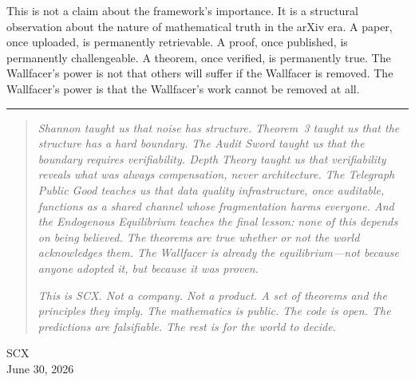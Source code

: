 \documentclass[11pt,a4paper]{article}
\theoremstyle{definition}
\begin{document}
This is not a claim about the framework's importance. It is a structural observation about the nature of mathematical truth in the arXiv era. A paper, once uploaded, is permanently retrievable. A proof, once published, is permanently challengeable. A theorem, once verified, is permanently true. The Wallfacer's power is not that others will suffer if the Wallfacer is removed. The Wallfacer's power is that the Wallfacer's work cannot be removed at all.

\vspace{1em}

\begin{center}
\rule{0.5\textwidth}{0.4pt}
\end{center}

\vspace{0.5em}

\begin{quote}
\small
\textit{Shannon taught us that noise has structure. Theorem~3 taught us that the structure has a hard boundary. The Audit Sword taught us that the boundary requires verifiability. Depth Theory taught us that verifiability reveals what was always compensation, never architecture. The Telegraph Public Good teaches us that data quality infrastructure, once auditable, functions as a shared channel whose fragmentation harms everyone. And the Endogenous Equilibrium teaches the final lesson: none of this depends on being believed. The theorems are true whether or not the world acknowledges them. The Wallfacer is already the equilibrium---not because anyone adopted it, but because it was proven.}

\medskip
\textit{This is SCX. Not a company. Not a product. A set of theorems and the principles they imply. The mathematics is public. The code is open. The predictions are falsifiable. The rest is for the world to decide.}
\end{quote}

\vfill

\begin{center}
{\small \textsc{SCX} \\ June 30, 2026}
\end{center}
\end{document}
